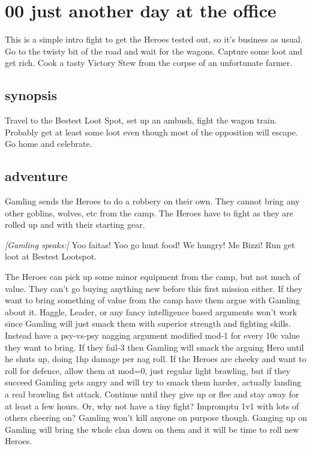 \section*{00 just another day at the office}
\label{00justanotherdayattheoffice}

This is a simple intro fight to get the Heroes tested out, so it's business as usual. Go to the twisty bit of the road and wait for the wagons. Capture some loot and get rich. Cook a tasty Victory Stew from the corpse of an unfortunate farmer.


\subsection*{synopsis}

Travel to the Bestest Loot Spot, set up an ambush, fight the wagon train. Probably get at least some loot even though most of the opposition will escape. Go home and celebrate.


\subsection*{adventure}

Gamling sends the Heroes to do a robbery on their own. They cannot bring any other goblins, wolves, etc from the camp. The Heroes have to fight as they are rolled up and with their starting gear.

\begin{readoutloud}
\emph{[Gamling speaks:]}
Yoo faitas! Yoo go hunt food! We hungry! Me Bizzi! Run get loot at Bestest Lootspot.
\end{readoutloud}

\noindent The Heroes can pick up some minor equipment from the camp, but not much of value. They can't go buying anything new before this first mission either. If they want to bring something of value from the camp have them argue with Gamling about it. Haggle, Leader, or any fancy intelligence based arguments won't work since Gamling will just smack them with superior strength and fighting skills. Instead have a psy-vs-psy nagging argument modified mod-1 for every 10c value they want to bring. If they fail-3 then Gamling will smack the arguing Hero until he shuts up, doing 1hp damage per nag roll. If the Heroes are cheeky and want to roll for defence, allow them at mod=0, just regular light brawling, but if they succeed Gamling gets angry and will try to smack them harder, actually landing a real brawling fist attack. Continue until they give up or flee and stay away for at least a few hours. Or, why not have a tiny fight? Impromptu 1v1 with lots of others cheering on? Gamling won't kill anyone on purpose though. Ganging up on Gamling will bring the whole clan down on them and it will be time to roll new Heroes.

